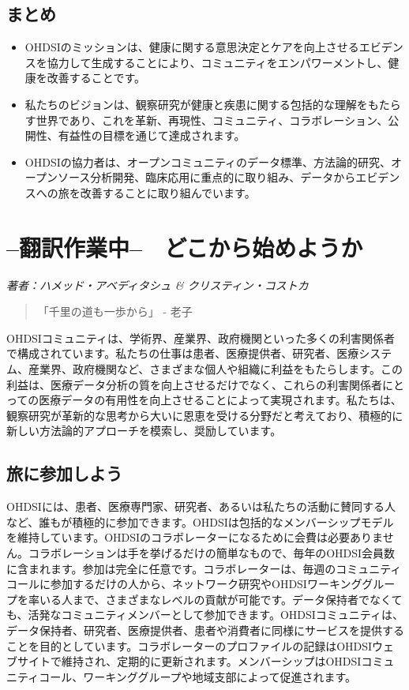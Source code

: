 \documentclass[
  11pt]{book}
\makeatletter
\newenvironment{kframe}{%
\medskip{}
\setlength{\fboxsep}{.8em}
 \def\at@end@of@kframe{}%
 \ifinner\ifhmode%
  \def\at@end@of@kframe{\end{minipage}}%
  \begin{minipage}{\columnwidth}%
 \fi\fi%
 \def\FrameCommand##1{\hskip\@totalleftmargin \hskip-\fboxsep
 \colorbox{myShadeColor}{##1}\hskip-\fboxsep
     \hskip-\linewidth \hskip-\@totalleftmargin \hskip\columnwidth}%
 \MakeFramed {\advance\hsize-\width
   \@totalleftmargin\z@ \linewidth\hsize
   \@setminipage}}%
 {\par\unskip\endMakeFramed%
 \at@end@of@kframe}
\newenvironment{rmdblock}[1]
  {
  \begin{itemize}
  \renewcommand{\labelitemi}{
    \raisebox{-.7\height}[0pt][0pt]{
      {\setkeys{Gin}{width=3em,keepaspectratio}\texttt{[image: images/\#1]}}
    }
  }
  \setlength{\fboxsep}{1em}
  \begin{kframe}
  \item
  }
  {
  \end{kframe}
  \end{itemize}
  }
\newenvironment{rmdsummary}
  {\begin{rmdblock}{summary}}
  {\end{rmdblock}}
\theoremstyle{definition}
\theoremstyle{definition}
\theoremstyle{definition}
\theoremstyle{definition}
\theoremstyle{remark}
\makeatother
\begin{document}
\section{まとめ}\label{ux307eux3068ux3081}

\begin{rmdsummary}
\begin{itemize}
\item
  OHDSIのミッションは、健康に関する意思決定とケアを向上させるエビデンスを協力して生成することにより、コミュニティをエンパワーメントし、健康を改善することです。
\item
  私たちのビジョンは、観察研究が健康と疾患に関する包括的な理解をもたらす世界であり、これを革新、再現性、コミュニティ、コラボレーション、公開性、有益性の目標を通じて達成されます。
\item
  OHDSIの協力者は、オープンコミュニティのデータ標準、方法論的研究、オープンソース分析開発、臨床応用に重点的に取り組み、データからエビデンスへの旅を改善することに取り組んでいます。
\end{itemize}
\end{rmdsummary}

\chapter{--翻訳作業中--　どこから始めようか}\label{WhereToBegin}

\emph{著者：ハメッド・アベディタシュ \& クリスティン・コストカ}

\begin{quote}
「千里の道も一歩から」 - 老子
\end{quote}

OHDSIコミュニティは、学術界、産業界、政府機関といった多くの利害関係者で構成されています。私たちの仕事は患者、医療提供者、研究者、医療システム、産業界、政府機関など、さまざまな個人や組織に利益をもたらします。この利益は、医療データ分析の質を向上させるだけでなく、これらの利害関係者にとっての医療データの有用性を向上させることによって実現されます。私たちは、観察研究が革新的な思考から大いに恩恵を受ける分野だと考えており、積極的に新しい方法論的アプローチを模索し、奨励しています。

\section{旅に参加しよう}\label{ux65c5ux306bux53c2ux52a0ux3057ux3088ux3046}

OHDSIには、患者、医療専門家、研究者、あるいは私たちの活動に賛同する人など、誰もが積極的に参加できます。OHDSIは包括的なメンバーシップモデルを維持しています。OHDSIのコラボレーターになるために会費は必要ありません。コラボレーションは手を挙げるだけの簡単なもので、毎年のOHDSI会員数に含まれます。参加は完全に任意です。コラボレーターは、毎週のコミュニティコールに参加するだけの人から、ネットワーク研究やOHDSIワーキンググループを率いる人まで、さまざまなレベルの貢献が可能です。データ保持者でなくても、活発なコミュニティメンバーとして参加できます。OHDSIコミュニティは、データ保持者、研究者、医療提供者、患者や消費者に同様にサービスを提供することを目的としています。コラボレーターのプロファイルの記録はOHDSIウェブサイトで維持され、定期的に更新されます。メンバーシップはOHDSIコミュニティコール、ワーキンググループや地域支部によって促進されます。
\end{document}
